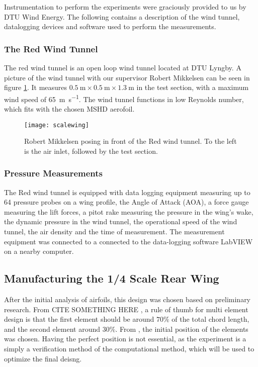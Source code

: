     Instrumentation to perform the experiments were graciously provided to us by DTU Wind Energy. The following contains a description of the wind tunnel, datalogging devices and software used to perform the measurements.

    \subsubsection{The Red Wind Tunnel}

      The red wind tunnel is an open loop wind tunnel located at DTU Lyngby. A picture of the wind tunnel with our supervisor Robert Mikkelsen can be seen in figure \ref{fig:theredwindtunnel}. It measures $\SI{0.5}{\metre} \times \SI{0.5}{\metre} \times \SI{1.3}{\metre}$ in the test section, with a maximum wind speed of \SI{65}{\metre\per\second}. The wind tunnel functions in low Reynolds number, which fits with the chosen MSHD aerofoil.

      \begin{figure}
        \texttt{[image: scalewing]}
        \caption{Robert Mikkelsen posing in front of the Red wind tunnel. To the left is the air inlet, followed by the test section.}
        \label{fig:theredwindtunnel}
      \end{figure}

    \subsubsection{Pressure Measurements}

      The Red wind tunnel is equipped with data logging equipment measuring up to 64 pressure probes on a wing profile, the Angle of Attack (AOA), a force gauge measuring the lift forces, a pitot rake measuring the pressure in the wing's wake, the dynamic pressure in the wind tunnel, the operational speed of the wind tunnel, the air density and the time of measurement. The measurement equipment was connected to a  connected to the data-logging software LabVIEW on a nearby computer.

  \subsection{Manufacturing the 1/4 Scale Rear Wing}

    After the initial analysis of airfoils, this design was chosen based on preliminary research. From CITE SOMETHING HERE  , a rule of thumb for multi element design is that the first element should be around $70\%$ of the total chord length, and the second element around $30\%$. From \cite{jkatz}, the initial position of the elements was chosen. Having the perfect position is not essential, as the experiment is a simply a verification method of the computational method, which will be used to optimize the final deisng.

